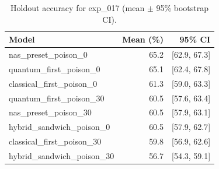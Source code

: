 \begin{table}[ht]
\centering
\caption{Holdout accuracy for exp_017 (mean $\pm$ 95\% bootstrap CI).}
\label{tab:exp_017}
\begin{tabular}{lrr}
\toprule
Model & Mean (\%) & 95\% CI \\
\midrule
nas\_preset\_poison\_0 & 65.2 & [62.9, 67.3] \\
quantum\_first\_poison\_0 & 65.1 & [62.4, 67.8] \\
classical\_first\_poison\_0 & 61.3 & [59.0, 63.3] \\
quantum\_first\_poison\_30 & 60.5 & [57.6, 63.4] \\
nas\_preset\_poison\_30 & 60.5 & [57.9, 63.1] \\
hybrid\_sandwich\_poison\_0 & 60.5 & [57.9, 62.7] \\
classical\_first\_poison\_30 & 59.8 & [56.9, 62.6] \\
hybrid\_sandwich\_poison\_30 & 56.7 & [54.3, 59.1] \\
\bottomrule
\end{tabular}
\end{table}
